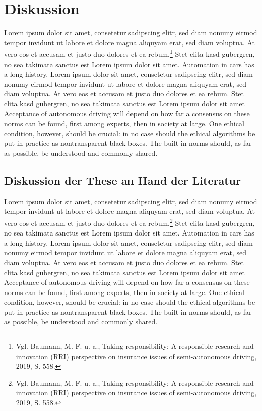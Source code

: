 \section{Diskussion}

Lorem ipsum dolor sit amet, consetetur sadipscing elitr, sed diam nonumy eirmod tempor invidunt ut labore et dolore magna aliquyam erat, sed diam voluptua. 
At vero eos et accusam et justo duo dolores et ea rebum.\footnote{Vgl. Baumann, M. F. u. a., Taking responsibility: A responsible research and innovation (RRI) perspective on insurance issues of semi-autonomous driving, 2019, S. 558.} 
Stet clita kasd gubergren, no sea takimata sanctus est Lorem ipsum dolor sit amet. 
Automation in cars has a long history.  Lorem ipsum dolor sit amet, consetetur sadipscing elitr, sed diam nonumy eirmod tempor invidunt ut labore et dolore magna aliquyam erat, sed diam voluptua. 
At vero eos et accusam et justo duo dolores et ea rebum. 
Stet clita kasd gubergren, no sea takimata sanctus est Lorem ipsum dolor sit amet Acceptance of autonomous driving will depend on how far a consensus on these norms can be found, first among experts, then in society at large. 
One ethical condition, however, should be crucial: in no case should the ethical algorithms be put in practice as nontransparent black boxes. 
The built-in norms should, as far as possible, be understood and commonly shared.

\subsection{Diskussion der These an Hand der Literatur}

Lorem ipsum dolor sit amet, consetetur sadipscing elitr, sed diam nonumy eirmod tempor invidunt ut labore et dolore magna aliquyam erat, sed diam voluptua. 
At vero eos et accusam et justo duo dolores et ea rebum.\footnote{Vgl. Baumann, M. F. u. a., Taking responsibility: A responsible research and innovation (RRI) perspective on insurance issues of semi-autonomous driving, 2019, S. 558.} 
Stet clita kasd gubergren, no sea takimata sanctus est Lorem ipsum dolor sit amet. 
Automation in cars has a long history.  Lorem ipsum dolor sit amet, consetetur sadipscing elitr, sed diam nonumy eirmod tempor invidunt ut labore et dolore magna aliquyam erat, sed diam voluptua. 
At vero eos et accusam et justo duo dolores et ea rebum. 
Stet clita kasd gubergren, no sea takimata sanctus est Lorem ipsum dolor sit amet Acceptance of autonomous driving will depend on how far a consensus on these norms can be found, first among experts, then in society at large. 
One ethical condition, however, should be crucial: in no case should the ethical algorithms be put in practice as nontransparent black boxes. 
The built-in norms should, as far as possible, be understood and commonly shared.

